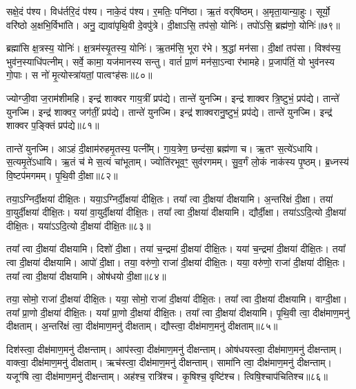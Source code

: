 सक्षे॒दं प॑श्य।
विध॑र्तरि॒दं प॑श्य।
नाके॒दं प॑श्य।
र॒मतिः॒ पनि॑ष्ठा।
ऋ॒तं वर्‌\mbox{}षि॑ष्ठम्।
अ॒मृता॒यान्या॒हुः।
सूर्यो॒ वरि॑ष्ठो अ॒क्षभि॒र्विभा॑ति।
अनु॒ द्यावा॑पृथि॒वी दे॒वपु॑त्रे।
दी॒क्षाऽसि॒ तप॑सो॒ योनिः॑।
तपो॑ऽसि॒ ब्रह्म॑णो॒ योनिः॑॥७९॥

ब्रह्मा॑सि क्ष॒त्रस्य॒ योनिः॑।
क्ष॒त्रम॑स्यृ॒तस्य॒ योनिः॑।
ऋ॒तम॑सि॒ भूरा र॑भे।
श्र॒द्धां मन॑सा।
दी॒क्षां तप॑सा।
विश्व॑स्य॒ भुव॑न॒स्याधि॑पत्नीम्।
सर्वे॒ कामा॒ यज॑मानस्य सन्तु।
वातं॑ प्रा॒णं मन॑सा॒\-ऽन्वा र॑भामहे।
प्र॒जा\-प॑तिं॒ यो भुव॑नस्य गो॒पाः।
स नो॑ मृ॒त्योस्त्रा॑यतां॒ पात्वꣳह॑सः॥८०॥

ज्योग्जी॒वा ज॒राम॑शीमहि।
इन्द्र॑ शाक्वर गाय॒त्रीं प्रप॑द्ये।
तान्ते॑ युनज्मि।
इन्द्र॑ शाक्वर त्रि॒ष्टुभं॒ प्रप॑द्ये।
तान्ते॑ युनज्मि।
इन्द्र॑ शाक्वर॒ जग॑तीं॒ प्रप॑द्ये।
तान्ते॑ युनज्मि।
इन्द्र॑ शाक्वरानु॒ष्टुभं॒ प्रप॑द्ये।
तान्ते॑ युनज्मि।
इन्द्र॑ शाक्वर प॒ङ्क्तिं प्रप॑द्ये॥८१॥

तान्ते॑ युनज्मि।
आऽहं दी॒क्षाम॑रुहमृ॒तस्य॒ पत्नी᳚म्।
गा॒य॒त्रेण॒ छन्द॑सा॒ ब्रह्म॑णा च।
ऋ॒तꣳ स॒त्ये॑\-ऽधायि।
स॒त्यमृ॒ते॑\-ऽधायि।
ऋ॒तं च॑ मे स॒त्यं चा॑भूताम्।
ज्योति॑रभूव॒ꣳ॒ सुव॑रगमम्।
सु॒व॒र्गं लो॒कं नाक॑स्य पृ॒ष्ठम्।
ब्र॒ध्नस्य॑ वि॒ष्टप॑मगमम्।
पृ॒थि॒वी दी॒क्षा॥८२॥

तया॒ऽग्निर्दी॒क्षया॑ दीक्षि॒तः।
यया॒ऽग्निर्दी॒क्षया॑ दीक्षि॒तः।
तया᳚ त्वा दी॒क्षया॑ दीक्षयामि।
अ॒न्तरि॑क्षं दी॒क्षा।
तया॑ वा॒युर्दी॒क्षया॑ दीक्षि॒तः।
यया॑ वा॒युर्दी॒क्षया॑ दीक्षि॒तः।
तया᳚ त्वा दी॒क्षया॑ दीक्षयामि।
द्यौर्दी॒क्षा।
तया॑ऽऽदि॒त्यो दी॒क्षया॑ दीक्षि॒तः।
यया॑ऽऽदि॒त्यो दी॒क्षया॑ दीक्षि॒तः॥८३॥

तया᳚ त्वा दी॒क्षया॑ दीक्षयामि।
दिशो॑ दी॒क्षा।
तया॑ च॒न्द्रमा॑ दी॒क्षया॑ दीक्षि॒तः।
यया॑ च॒न्द्रमा॑ दी॒क्षया॑ दीक्षि॒तः।
तया᳚ त्वा दी॒क्षया॑ दीक्षयामि।
आपो॑ दी॒क्षा।
तया॒ वरु॑णो॒ राजा॑ दी॒क्षया॑ दीक्षि॒तः।
यया॒ वरु॑णो॒ राजा॑ दी॒क्षया॑ दीक्षि॒तः।
तया᳚ त्वा दी॒क्षया॑ दीक्षयामि।
ओष॑धयो दी॒क्षा॥८४॥

तया॒ सोमो॒ राजा॑ दी॒क्षया॑ दीक्षि॒तः।
यया॒ सोमो॒ राजा॑ दी॒क्षया॑ दीक्षि॒तः।
तया᳚ त्वा दी॒क्षया॑ दीक्षयामि।
वाग्दी॒क्षा।
तया᳚ प्रा॒णो दी॒क्षया॑ दीक्षि॒तः।
यया᳚ प्रा॒णो दी॒क्षया॑ दीक्षि॒तः।
तया᳚ त्वा दी॒क्षया॑ दीक्षयामि।
पृ॒थि॒वी त्वा॒ दीक्ष॑\-माण॒\-मनु॑ दीक्षताम्।
अ॒न्तरि॑क्षं त्वा॒ दीक्ष॑\-माण॒\-मनु॑ दीक्षताम्।
द्यौस्त्वा॒ दीक्ष॑\-माण॒\-मनु॑ दीक्षताम्॥८५॥

दिश॑स्त्वा॒ दीक्ष॑\-माण॒\-मनु॑ दीक्षन्ताम्।
आप॑स्त्वा॒ दीक्ष॑\-माण॒\-मनु॑ दीक्षन्ताम्।
ओष॑धयस्त्वा॒ दीक्ष॑\-माण॒\-मनु॑ दीक्षन्ताम्।
वाक्त्वा॒ दीक्ष॑\-माण॒\-मनु॑ दीक्षताम्।
ऋच॑स्त्वा॒ दीक्ष॑\-माण॒\-मनु॑ दीक्षन्ताम्।
सामा॑नि त्वा॒ दीक्ष॑\-माण॒\-मनु॑ दीक्षन्ताम्।
यजूꣳ॑षि त्वा॒ दीक्ष॑\-माण॒\-मनु॑ दीक्षन्ताम्।
अह॑श्च॒ रात्रि॑श्च।
कृ॒षिश्च॒ वृष्टि॑श्च।
त्विषि॒श्चाप॑चितिश्च॥८६॥

